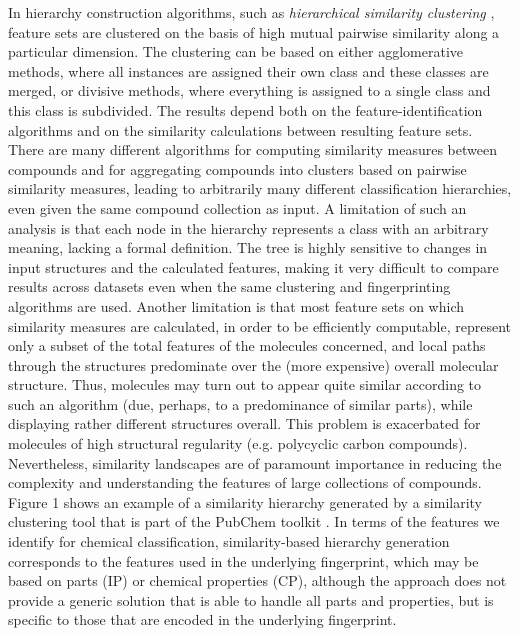 \documentclass[10pt]{bmc_article}
\newenvironment{bmcformat}{\baselineskip20pt\sloppy\setboolean{publ}{false}}{\baselineskip20pt\sloppy}
\begin{document}
\begin{bmcformat}
In hierarchy construction algorithms, such as \textit{hierarchical similarity clustering} \cite{Adamson1981,barnard1992}, feature sets are clustered on the basis of high mutual pairwise similarity along a particular dimension.  The clustering can be based on either agglomerative methods, where all instances are assigned their own class and these classes are merged, or divisive methods, where everything is assigned to a single class and this class is subdivided. The results depend both on the feature-identification algorithms and on the similarity calculations between resulting feature sets. There are many different algorithms for computing similarity measures between compounds and for aggregating compounds into clusters based on pairwise similarity measures, leading to arbitrarily many different classification hierarchies, even given the same compound collection as input.  A limitation of such an analysis is that each node in the hierarchy represents a class with an arbitrary meaning, lacking a formal definition.  The tree is highly sensitive to changes in input structures and the calculated features, making it very difficult to compare results across datasets even when the same clustering and fingerprinting algorithms are used. Another limitation is that most feature sets on which similarity measures are calculated, in order to be efficiently computable, represent only a subset of the total features of the molecules concerned, and local paths through the structures predominate over the (more expensive) overall molecular structure. Thus, molecules may turn out to appear quite similar according to such an algorithm (due, perhaps, to a predominance of similar parts), while displaying rather different structures overall.  This problem is exacerbated for molecules of high structural regularity (e.g. polycyclic carbon compounds).  Nevertheless, similarity landscapes are of paramount importance in reducing the complexity and understanding the features of large collections of compounds.
Figure 1 shows an example of a similarity hierarchy generated by a similarity clustering tool that is part of the PubChem toolkit \cite{bolton2008}. 
In terms of the features we identify for chemical classification, similarity-based hierarchy generation corresponds to the features used in the underlying fingerprint, which may be based on parts (IP) or chemical properties (CP), although the approach does not provide a generic solution that is able to handle all parts and properties, but is specific to those that are encoded in the underlying fingerprint. 


\end{bmcformat}
\end{document}

